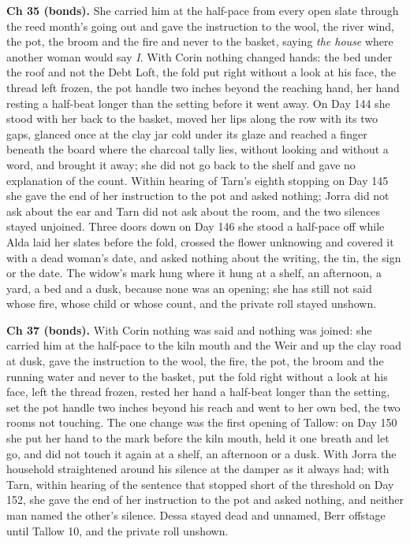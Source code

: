 \documentclass{design/chronicle}
\begin{document}
{\textbf{Ch 35 (bonds).} She carried him at the half-pace from every open slate through the reed month’s going out and gave the instruction to the wool, the river wind, the pot, the broom and the fire and never to the basket, saying \emph{the house} where another woman would say \emph{I}. With Corin nothing changed hands: the bed under the roof and not the Debt Loft, the fold put right without a look at his face, the thread left frozen, the pot handle two inches beyond the reaching hand, her hand resting a half-beat longer than the setting before it went away. On Day 144 she stood with her back to the basket, moved her lips along the row with its two gaps, glanced once at the clay jar cold under its glaze and reached a finger beneath the board where the charcoal tally lies, without looking and without a word, and brought it away; she did not go back to the shelf and gave no explanation of the count. Within hearing of Tarn’s eighth stopping on Day 145 she gave the end of her instruction to the pot and asked nothing; Jorra did not ask about the ear and Tarn did not ask about the room, and the two silences stayed unjoined. Three doors down on Day 146 she stood a half-pace off while Alda laid her slates before the fold, crossed the flower unknowing and covered it with a dead woman’s date, and asked nothing about the writing, the tin, the sign or the date. The widow’s mark hung where it hung at a shelf, an afternoon, a yard, a bed and a dusk, because none was an opening; she has still not said whose fire, whose child or whose count, and the private roll stayed unshown.

\textbf{Ch 37 (bonds).} With Corin nothing was said and nothing was joined: she carried him at the half-pace to the kiln mouth and the Weir and up the clay road at dusk, gave the instruction to the wool, the fire, the pot, the broom and the running water and never to the basket, put the fold right without a look at his face, left the thread frozen, rested her hand a half-beat longer than the setting, set the pot handle two inches beyond his reach and went to her own bed, the two rooms not touching. The one change was the first opening of Tallow: on Day 150 she put her hand to the mark before the kiln mouth, held it one breath and let go, and did not touch it again at a shelf, an afternoon or a dusk. With Jorra the household straightened around his silence at the damper as it always had; with Tarn, within hearing of the sentence that stopped short of the threshold on Day 152, she gave the end of her instruction to the pot and asked nothing, and neither man named the other’s silence. Dessa stayed dead and unnamed, Berr offstage until Tallow 10, and the private roll unshown.

}
\end{document}
